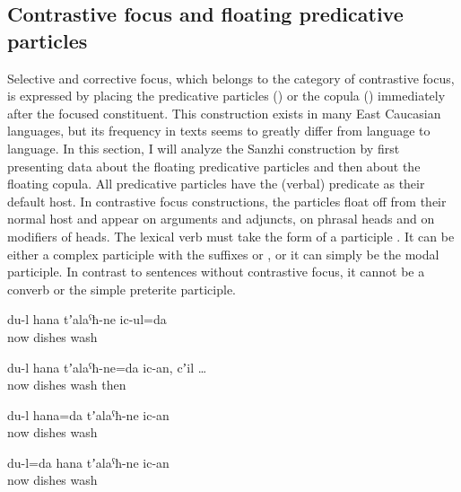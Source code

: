 
\subsection{Contrastive focus and floating predicative particles}
\label{ssec:Contrastive focus and floating predicative particles}

Selective and corrective focus, which belongs to the category of contrastive focus, is expressed by placing the predicative particles () or the copula () immediately after the focused constituent. This construction exists in many East Caucasian languages, but its frequency in texts seems to greatly differ from language to language. In this section, I will analyze the Sanzhi construction by first presenting data about the floating predicative particles and then about the floating copula. All predicative particles have the (verbal) predicate as their default host. In contrastive focus constructions, the particles float off from their normal host and appear on arguments and adjuncts, on phrasal heads and on modifiers of heads. The lexical verb must take the form of a participle . It can be either a complex participle with the suffixes  or , or it can simply be the modal participle. In contrast to sentences without contrastive focus, it cannot be a converb or the simple preterite participle.
%
\begin{exe}
	\ex	\label{ex:Now I am cleaning the dishes@3}
	\gll	du-l 	hana 	tʼalaˁħ-ne 	ic-ul=da\\
			now	dishes	wash\\
	\glt	{}

	\ex	\label{ex:Now I am cleaning the dishes@4}
	\gll	du-l 	hana	tʼalaˁħ-ne=da	ic-an,	cʼil	\ldots\\
			now	dishes	wash	then\\
	\glt	{}

	\ex	\label{ex:NOW I am washing the dishes@5}
	\gll	du-l	hana=da	tʼalaˁħ-ne	ic-an\\
			now	dishes	wash\\
	\glt	{}

	\ex	\label{ex:It is ME who is washing the dishes now@6}
	\gll	du-l=da	hana	tʼalaˁħ-ne	ic-an\\
			now	dishes	wash\\
	\glt	{}
\end{exe}

